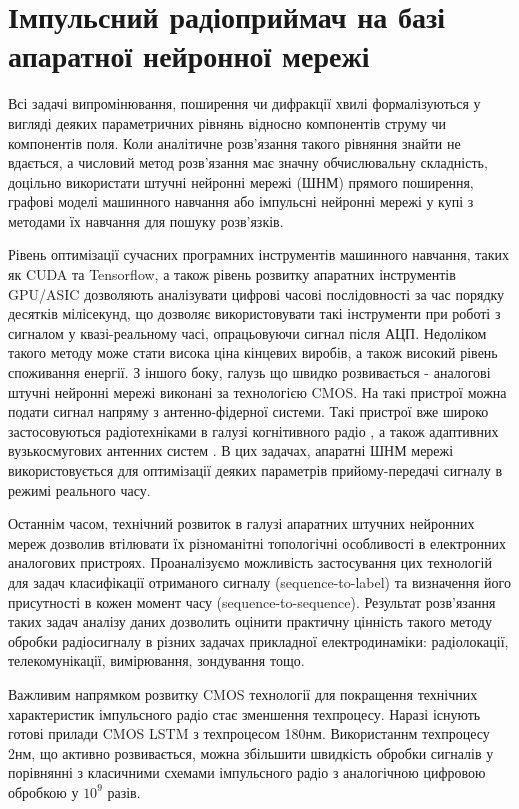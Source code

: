 \section{Імпульсний радіоприймач на базі апаратної нейронної мережі}

Всі задачі випромінювання, поширення чи дифракції хвилі формалізуються
у вигляді деяких параметричних рівнянь відносно компонентів струму чи 
компонентів поля. Коли аналітичне розв'язання такого рівняння знайти не 
вдається, а числовий метод розв'язання має значну обчислювальну складність, 
доцільно використати штучні нейронні мережі (ШНМ) прямого поширення, графові 
моделі машинного навчання або імпульсні нейронні мережі у купі з методами їх 
навчання для пошуку розв'язків.

Рівень оптимізації сучасних програмних інструментів машинного навчання, таких 
як CUDA та Tensorflow, а також рівень розвитку апаратних інструментів GPU/ASIC
дозволяють аналізувати цифрові часові послідовності за час порядку 
десятків мілісекунд, що дозволяє використовувати такі інструменти при роботі 
з сигналом у квазі-реальному часі, опрацьовуючи сигнал після АЦП. Недоліком 
такого методу може стати висока ціна кінцевих виробів, а також високий 
рівень споживання енергії. З іншого боку, галузь що швидко розвивається - 
аналогові штучні нейронні мережі виконані за технологією CMOS. На такі 
пристрої можна подати сигнал напряму з антенно-фідерної системи. Такі 
пристрої вже широко застосовуються радіотехніками в галузі когнітивного 
радіо \cite{imp:Husseini2010}, а також адаптивних вузькосмугових антенних 
систем \cite{imp:Zbynek2002}. В цих задачах, апаратні ШНМ мережі 
використовується для оптимізації деяких параметрів прийому-передачі сигналу 
в режимі реального часу.

Останнім часом, технічний розвиток в галузі апаратних штучних нейронних мереж 
дозволив втілювати їх різноманітні топологічні особливості в електронних 
аналогових пристроях. Проаналізуємо можливість застосування цих технологій для 
задач класифікації отриманого сигналу (sequence-to-label) та визначення його 
присутності в кожен момент часу (sequence-to-sequence). Результат розв'язання 
таких задач аналізу даних дозволить оцінити практичну цінність 
такого методу обробки радіосигналу в різних задачах 
прикладної електродинаміки: радіолокації, телекомунікації, вимірювання, 
зондування тощо. 

Важливим напрямком розвитку CMOS технології для покращення технічних 
характеристик імпульсного радіо стає зменшення техпроцесу. Наразі існують
готові прилади CMOS LSTM з техпроцесом 180нм. Використаннм техпроцесу 2нм,
що активно розвивається, можна збільшити швидкість обробки сигналів у 
порівнянні з класичними схемами імпульсного радіо з аналогічною цифровою 
обробкою у $ 10^9 $ разів.

